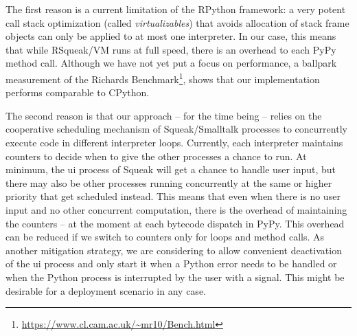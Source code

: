 \documentclass[sigconf,english]{acmart}
\newcommand{\ac}[1]{\gls*{#1}}
\newcommand*\Squeak{Squeak\slash Smalltalk\xspace}
\begin{document}
The first reason is a current limitation of the RPython framework: a very
potent call stack optimization (called \emph{virtualizables}) that avoids
allocation of stack frame objects can only be applied to at most one
interpreter. In our case, this means that while RSqueak/VM runs at full speed,
there is an overhead to each PyPy method call. Although we have not yet put a
focus on performance, a ballpark measurement of the Richards
Benchmark\footnote{\url{https://www.cl.cam.ac.uk/~mr10/Bench.html}}, shows that
our implementation performs comparable to CPython.

The second reason is that our approach \--- for the time being \--- relies on
the cooperative scheduling mechanism of \Squeak processes to concurrently
execute code in different interpreter loops. Currently, each interpreter
maintains counters to decide when to give the other processes a chance to run.
At minimum, the \ac{ui} process of Squeak will get a chance to handle user
input, but there may also be other processes running concurrently at the same
or higher priority that get scheduled instead. This means that even when there
is no user input and no other concurrent computation, there is the overhead of
maintaining the counters \--- at the moment at each bytecode dispatch in PyPy.
This overhead can be reduced if we switch to counters only for loops and method
calls. As another mitigation strategy, we are considering to allow convenient
deactivation of the \ac{ui} process and only start it when a Python error
needs to be handled or when the Python process is interrupted by the user with a
signal.
This might be desirable for a deployment scenario in any case.

\end{document}
